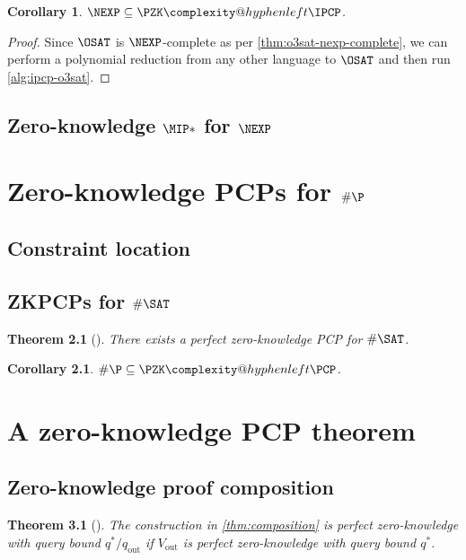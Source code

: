 \documentclass[english,12pt]{reedthesis}
\makeatletter
\theoremstyle{plain}
\newtheorem{thm}{Theorem}[section]
\newtheorem{cor}[cor]{Corollary}
\theoremstyle{definition}
\theoremstyle{remark}
\DeclareMathOperator{\out}{out}
\newcommand{\PZKPCP}{%
  \PZK\complexity@hyphenleft\PCP
}
\newcommand{\PZKIPCP}{%
  \PZK\complexity@hyphenleft\IPCP
}
\makeatother
\begin{document}
\begin{cor}\label{nexp-pzkipcp}
  $\NEXP \subseteq \PZKIPCP$.
\end{cor}

\begin{proof}
  Since $\OSAT$ is $\NEXP$-complete as per \cref{thm:o3sat-nexp-complete}, we
  can perform a polynomial reduction from any other language to $\OSAT$ and then
  run \cref{alg:ipcp-o3sat}.
\end{proof}

\section{Zero-knowledge $\MIP*$ for $\NEXP$}\label{sec:zk-mipstar-nexp}

\chapter{Zero-knowledge PCPs for $\#\P$}\label{chap:zk-pcp-for-hp}

\section{Constraint location}\label{sec:constraint-loc}

\section{ZKPCPs for $\#\SAT$}\label{sec:zkpcp-hsat}

\begin{thm}[{\cite[Theorem 8.1]{GOS24}}]\label{thm:pzkpcp-for-sat}
  There exists a perfect zero-knowledge PCP for $\#\SAT$.
\end{thm}

\begin{cor}\label{cor:hashp-subset-pzkpcp}
  $\#\P \subseteq \PZKPCP$.
\end{cor}

\chapter{A zero-knowledge PCP theorem}\label{chap:zk-pcp-theorem}

\section{Zero-knowledge proof composition}\label{sec:zk-proof-comp}

\begin{thm}[{\cite[Theorem 3.7]{GOS25}}]\label{thm:comp-pzk}
  The construction in \cref{thm:composition} is perfect zero-knowledge with
  query bound $q^{*}/q_{\out}$ if $V_{\out}$ is perfect zero-knowledge with
  query bound $q^{*}$.
\end{thm}
\end{document}
